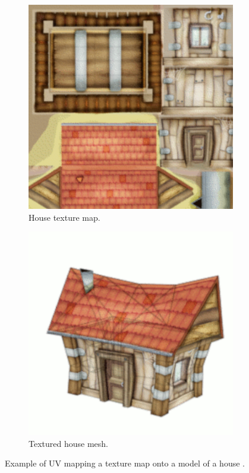 \begin{figure}[h!]
  \centering
  \begin{subfigure}[b]{0.30\textwidth}
    \includegraphics[width=\textwidth]{figure/uv-mapping1.png}
    \caption{House texture map.}
  \end{subfigure}
  \quad
  \quad
  \quad
  \begin{subfigure}[b]{0.30\textwidth}
    \includegraphics[width=\textwidth]{figure/uv-mapping2.png}
    \caption{Textured house mesh.}
  \end{subfigure}

  \caption{Example of UV mapping a texture map onto a model of a house \cite{house_uv_mapping}.}
  \label{fig:uv-mapping}
\end{figure}


